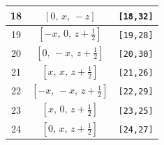 \documentclass[fleqn,8pt]{jsarticle}
\begin{document}
\begin{longtable}{ccc}
18 & $\left[ 0,\, x,\, - z \right]$ & {\tt [18,32]} \\ \hline
19 & $\left[ - x,\, 0,\, z + \frac{1}{2} \right]$ & {\tt [19,28]} \\ \hline
20 & $\left[ 0,\, - x,\, z + \frac{1}{2} \right]$ & {\tt [20,30]} \\ \hline
21 & $\left[ x,\, x,\, z + \frac{1}{2} \right]$ & {\tt [21,26]} \\ \hline
22 & $\left[ - x,\, - x,\, z + \frac{1}{2} \right]$ & {\tt [22,29]} \\ \hline
23 & $\left[ x,\, 0,\, z + \frac{1}{2} \right]$ & {\tt [23,25]} \\ \hline
24 & $\left[ 0,\, x,\, z + \frac{1}{2} \right]$ & {\tt [24,27]} \\
\end{longtable}
\renewcommand{\arraystretch}{1.2}
\end{document}
